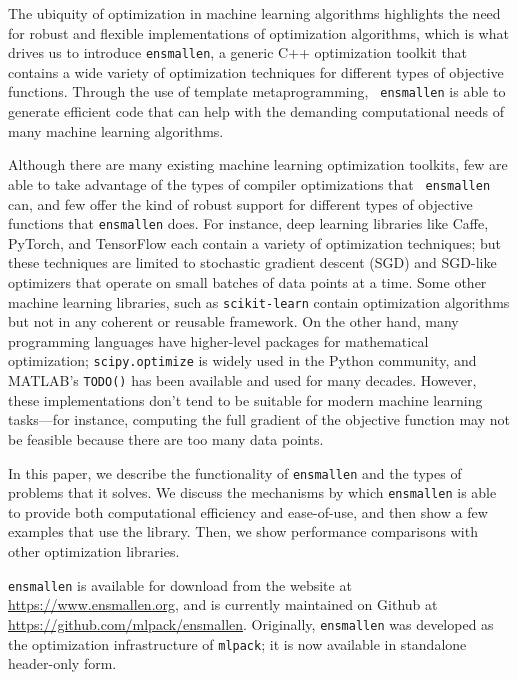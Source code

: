 \documentclass{article}
\begin{document}
The ubiquity of optimization in machine learning algorithms highlights the need
for robust and flexible implementations of optimization algorithms, which is
what drives us to introduce {\tt ensmallen}, a generic C++ optimization toolkit
that contains a wide variety of optimization techniques for different types of
objective functions.  Through the use of template metaprogramming, {\tt
ensmallen} is able to generate efficient code that can help with the
demanding computational needs of many machine learning algorithms.

Although there are many existing machine learning optimization toolkits, few
are able to take advantage of the types of compiler optimizations that {\tt
ensmallen} can, and few offer the kind of robust support for different types of
objective functions that {\tt ensmallen} does.  For instance, deep learning
libraries like Caffe, %
PyTorch, %
and TensorFlow %
each contain a variety of optimization techniques; but these techniques are
limited to stochastic gradient descent (SGD) and SGD-like optimizers that
operate on small batches of data points at a time.  Some other machine learning
libraries, such as {\tt scikit-learn} %
contain optimization algorithms but not in any coherent or reusable framework.
On the other hand, many programming languages have higher-level packages for
mathematical optimization; {\tt scipy.optimize} %
is widely used in the Python community, and MATLAB's {\tt TODO()}
has been available and used for many decades.  However, these implementations
don't tend to be suitable for modern machine learning tasks---for instance,
computing the full gradient of the objective function may not be feasible
because there are too many data points.

In this paper, we describe the functionality of {\tt ensmallen} and the types of
problems that it solves.  We discuss the mechanisms by which {\tt ensmallen} is
able to provide both computational efficiency and ease-of-use, and then show a
few examples that use the library.  Then, we show performance comparisons with
other optimization libraries.

{\tt ensmallen} is available for download from the website at
\url{https://www.ensmallen.org}, and is currently maintained on Github at
\url{https://github.com/mlpack/ensmallen}.  Originally, {\tt ensmallen} was
developed as the optimization infrastructure of {\tt mlpack}; %
it is now available in standalone header-only form.
\end{document}
